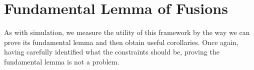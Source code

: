 
\section{Fundamental Lemma of Fusions}

As with simulation, we measure the utility of this framework by the way we can
prove its fundamental lemma and then obtain useful corollaries. Once again,
having carefully identified what the constraints should be, proving the fundamental
lemma is not a problem.

